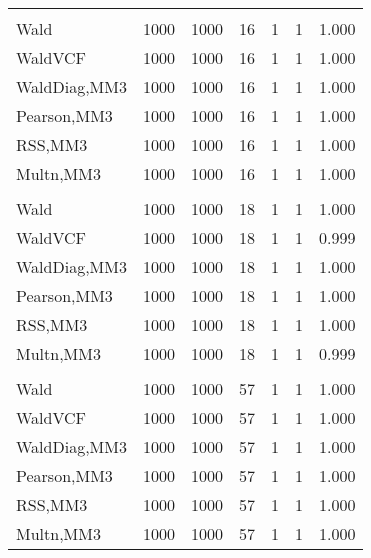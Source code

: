 \documentclass[
]{article}
\begin{document}
\begin{table}[H]
{\begin{tabular}[t]{lrrrrrr}
\addlinespace[0.3em]
\multicolumn{7}{l}{\textbf{1F 15V}}\\
\hspace{1em}Wald & 1000 & 1000 & 16 & 1 & 1 & 1.000\\
\hspace{1em}WaldVCF & 1000 & 1000 & 16 & 1 & 1 & 1.000\\
\hspace{1em}WaldDiag,MM3 & 1000 & 1000 & 16 & 1 & 1 & 1.000\\
\hspace{1em}Pearson,MM3 & 1000 & 1000 & 16 & 1 & 1 & 1.000\\
\hspace{1em}RSS,MM3 & 1000 & 1000 & 16 & 1 & 1 & 1.000\\
\hspace{1em}Multn,MM3 & 1000 & 1000 & 16 & 1 & 1 & 1.000\\
\addlinespace[0.3em]
\multicolumn{7}{l}{\textbf{2F 10V}}\\
\hspace{1em}Wald & 1000 & 1000 & 18 & 1 & 1 & 1.000\\
\hspace{1em}WaldVCF & 1000 & 1000 & 18 & 1 & 1 & 0.999\\
\hspace{1em}WaldDiag,MM3 & 1000 & 1000 & 18 & 1 & 1 & 1.000\\
\hspace{1em}Pearson,MM3 & 1000 & 1000 & 18 & 1 & 1 & 1.000\\
\hspace{1em}RSS,MM3 & 1000 & 1000 & 18 & 1 & 1 & 1.000\\
\hspace{1em}Multn,MM3 & 1000 & 1000 & 18 & 1 & 1 & 0.999\\
\addlinespace[0.3em]
\multicolumn{7}{l}{\textbf{3F 15V}}\\
\hspace{1em}Wald & 1000 & 1000 & 57 & 1 & 1 & 1.000\\
\hspace{1em}WaldVCF & 1000 & 1000 & 57 & 1 & 1 & 1.000\\
\hspace{1em}WaldDiag,MM3 & 1000 & 1000 & 57 & 1 & 1 & 1.000\\
\hspace{1em}Pearson,MM3 & 1000 & 1000 & 57 & 1 & 1 & 1.000\\
\hspace{1em}RSS,MM3 & 1000 & 1000 & 57 & 1 & 1 & 1.000\\
\hspace{1em}Multn,MM3 & 1000 & 1000 & 57 & 1 & 1 & 1.000\\
\bottomrule
\end{tabular}}
\endgroup{}
\end{table}
\end{document}
